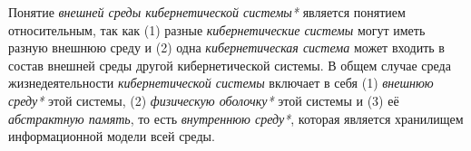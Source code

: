 Понятие \textit{внешней среды кибернетической системы*} является понятием относительным, так как (1) разные \textit{кибернетические системы} могут иметь разную внешнюю среду и (2) одна \textit{кибернетическая система} может входить в состав внешней среды другой кибернетической системы. 
В общем случае среда жизнедеятельности \textit{кибернетической системы} включает в себя (1) \textit{внешнюю среду*} этой системы, (2) \textit{физическую оболочку*} этой системы и (3) её \textit{абстрактную память}, то есть \textit{внутреннюю среду*}, которая является хранилищем информационной модели всей среды.
